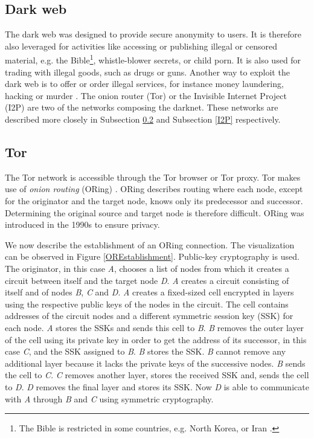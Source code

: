 \subsection{Dark web} \label{darkWeb}
The dark web was designed to provide secure anonymity to users. It is therefore also leveraged for activities like accessing or publishing illegal or censored material, e.g. the Bible\footnote{The Bible is restricted in some countries, e.g. North Korea, or Iran \cite{illegalBible}.}, whistle-blower secrets, or child porn. It is also used for trading with illegal goods, such as drugs or guns. Another way to exploit the dark web is to offer or order illegal services, for instance money laundering, hacking or murder \cite{theDarkNet}. The onion router (Tor) or the Invisible Internet Project (I2P) are two of the networks composing the darknet. These networks are described more closely in Subsection \ref{tor} and Subsection \ref{I2P} respectively.

\subsection{Tor} \label{tor}
The Tor network \cite{torIntro} is accessible through the Tor browser or Tor proxy. Tor makes use of \textit{onion routing} (ORing) \cite{onionRouting}. ORing describes routing where each node, except for the originator and the target node, knows only its predecessor and successor. Determining the original source and target node is therefore difficult. ORing was introduced in the 1990s to ensure privacy. 

We now describe the establishment of an ORing connection. The visualization can be observed in Figure \ref{OREstablishment}. Public-key cryptography is used. The originator, in this case \textit{A}, chooses a list of nodes from which it creates a circuit between itself and the target node \textit{D}. \textit{A} creates a circuit consisting of itself and of nodes \textit{B}, \textit{C} and \textit{D}. \textit{A} creates a fixed-sized cell encrypted in layers using the respective public keys of the nodes in the circuit. The cell contains addresses of the circuit nodes and a different symmetric session key (SSK) for each node. \textit{A} stores the SSKs and sends this cell to \textit{B}. \textit{B} removes the outer layer of the cell using its private key in order to get the address of its successor, in this case \textit{C}, and the SSK assigned to \textit{B}. \textit{B} stores the SSK. \textit{B} cannot remove any additional layer because it lacks the private keys of the successive nodes. \textit{B} sends the cell to \textit{C}. \textit{C} removes another layer, stores the received SSK and, sends the cell to \textit{D}. \textit{D} removes the final layer and stores its SSK. Now \textit{D} is able to communicate with \textit{A} through \textit{B} and \textit{C} using symmetric cryptography. 

